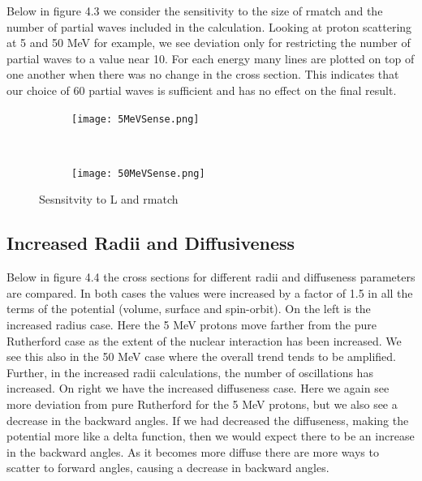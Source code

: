 \documentclass[paper=a4, fontsize=11pt]{scrartcl} %
\numberwithin{equation}{section} %
\numberwithin{figure}{section} %
\numberwithin{table}{section} %
\begin{document}
Below in figure 4.3 we consider the sensitivity to the size of rmatch and the number of partial waves included in the calculation.  Looking at proton scattering at 5 and 50 MeV for example, we see deviation only for restricting the number of partial waves to a value near 10.  For each energy many lines are plotted on top of one another when there was no change in the cross section.  This indicates that our choice of 60 partial waves is sufficient and has no effect on the final result.

 \begin{figure}[hbt]
        \centering
        \begin{subfigure}[b!]{0.5\textwidth}
                \texttt{[image: 5MeVSense.png]}
        \end{subfigure}%
        ~ %
\quad
        \begin{subfigure}[b!]{0.5\textwidth}
                \texttt{[image: 50MeVSense.png]}
        \end{subfigure}

        \caption{Sesnsitvity to L and rmatch}
\end{figure}


\subsection{Increased Radii and Diffusiveness}

Below in figure 4.4 the cross sections for different radii and diffuseness parameters are compared. In both cases the values were increased by a factor of 1.5 in all the terms of the potential (volume, surface and spin-orbit). On the left is the increased radius case. Here the 5 MeV protons move farther from the pure Rutherford case as the extent of the nuclear interaction has been increased. We see this also in the 50 MeV case where the overall trend tends to be amplified.  Further, in the increased radii calculations, the number of oscillations has increased.  On right we have the increased diffuseness case. Here we again see more deviation from pure Rutherford for the 5 MeV protons, but we also see a decrease in the backward angles. If we had decreased the diffuseness, making the potential more like a delta function, then we would expect there to be an increase in the backward angles. As it becomes more diffuse there are more ways to scatter to forward angles, causing a decrease in backward angles.
\end{document}
